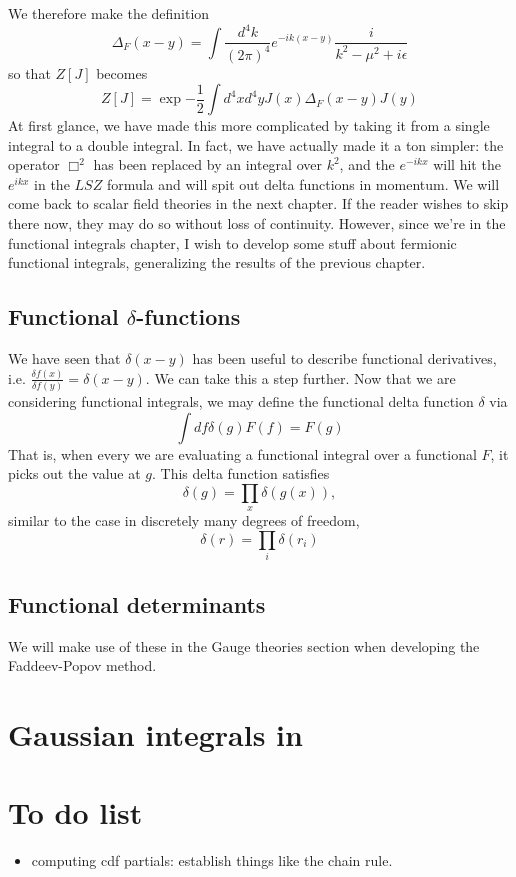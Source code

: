 \documentclass{book}
\begin{document}
We therefore make the definition
\[
\Delta_F (x - y) = \int \frac{d^4 k}{(2\pi)^4}e^{-ik(x-y)} \frac{i}{k^2 - \mu^2 + i \epsilon}
\]
so that $Z[J]$ becomes
\[
Z[J]= \exp{-\frac{1}{2} \int d^4 x d^4 y J(x) \Delta_F (x-y) J(y)}
\]
At first glance, we have made this more complicated by taking it from a single integral to a double integral. In fact, we have actually made it a ton simpler: the operator $\Box^2$ has been replaced by an integral over $k^2$, and the $e^{-ikx}$ will hit the $e^{ikx}$ in the $LSZ$ formula and will spit out delta functions in momentum. We will come back to scalar field theories in the next chapter. If the reader wishes to skip there now, they may do so without loss of continuity. However, since we're in the functional integrals chapter, I wish to develop some stuff about fermionic functional integrals, generalizing the results of the previous chapter. 

\subsection{Functional $\delta$-functions}
We have seen that $\delta(x-y)$ has been useful to describe functional derivatives, i.e. $\frac{\delta f(x)}{\delta f(y)} = \delta(x-y)$. We can take this a step further. Now that we are considering functional integrals, we may define the functional delta function $\delta$ via
\[
\int df \delta(g) F(f) = F(g)
\]
That is, when every we are evaluating a functional integral over a functional $F$, it picks out the value at $g$. This delta function satisfies
\[
\delta(g) = \prod_x \delta(g(x)),
\]
similar to the case in discretely many degrees of freedom,
\[
\delta(r) = \prod_i \delta(r_i)
\]
\subsection{Functional determinants}
We will make use of these in the Gauge theories section when developing the Faddeev-Popov method.

\section{Gaussian integrals in }
\section{To do list}
\begin{itemize}
\item computing cdf partials: establish things like the chain rule.
\end{itemize}
\end{document}
